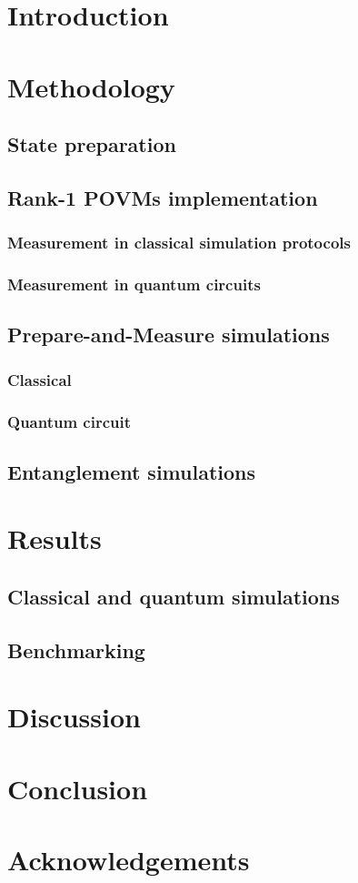 \documentclass{article}
\begin{document}

\newpage

\newpage
\tableofcontents

\newpage
\section{Introduction}


\section{Methodology}
\subsection{State preparation}

\subsection{Rank-1 POVMs implementation}
\subsubsection{Measurement in classical simulation protocols}
\subsubsection{Measurement in quantum circuits}
\subsection{Prepare-and-Measure simulations}
\subsubsection{Classical}
\subsubsection{Quantum circuit}
\subsection{Entanglement simulations}

\section{Results}
\subsection{Classical and quantum simulations}
\subsection{Benchmarking}
\section{Discussion}
\section{Conclusion}
\section{Acknowledgements}

\newpage
\printbibliography
\end{document}
